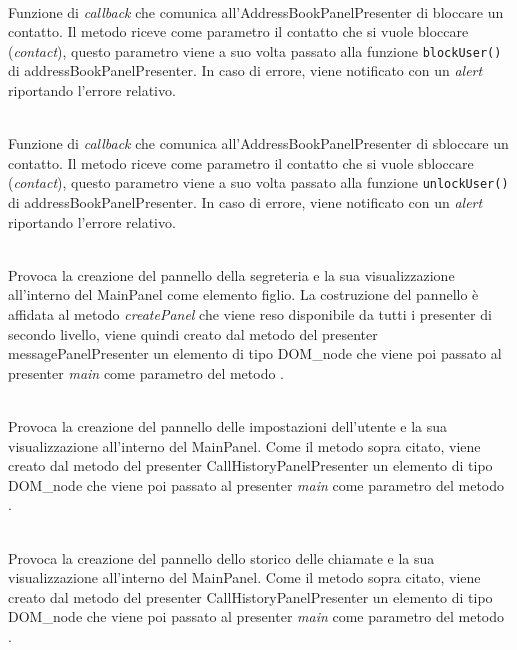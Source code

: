 \begin{description}
\item{}\\
Funzione di \textit{callback} che comunica all'AddressBookPanelPresenter di bloccare un contatto. Il metodo riceve come parametro il contatto che si vuole bloccare (\textit{contact}), questo parametro viene a suo volta passato alla funzione \texttt{blockUser()} di addressBookPanelPresenter. In caso di errore, viene notificato con un \textit{alert} riportando l'errore relativo.


\item{}\\
Funzione di \textit{callback} che comunica all'AddressBookPanelPresenter di sbloccare un contatto. Il metodo riceve come parametro il contatto che si vuole sbloccare (\textit{contact}), questo parametro viene a suo volta passato alla funzione \texttt{unlockUser()} di addressBookPanelPresenter. In caso di errore, viene notificato con un \textit{alert} riportando l'errore relativo.


\item{}\\
Provoca la creazione del pannello della segreteria e la sua visualizzazione all'interno del MainPanel come elemento figlio. La costruzione del pannello è affidata al metodo \textit{createPanel} che viene reso disponibile da tutti i presenter di secondo livello, viene quindi creato dal metodo  del presenter messagePanelPresenter un elemento di tipo DOM\_node che viene poi passato al presenter \textit{main} come parametro del metodo .


\item{}\\
Provoca la creazione del pannello delle impostazioni dell'utente e la sua visualizzazione all'interno del MainPanel. Come il metodo sopra citato, viene creato dal metodo  del presenter CallHistoryPanelPresenter un elemento di tipo DOM\_node che viene poi passato al presenter \textit{main} come parametro del metodo .


\item{}\\
Provoca la creazione del pannello dello storico delle chiamate e la sua visualizzazione all'interno del MainPanel. Come il metodo sopra citato, viene creato dal metodo  del presenter CallHistoryPanelPresenter un elemento di tipo DOM\_node che viene poi passato al presenter \textit{main} come parametro del metodo .



\end{description}
